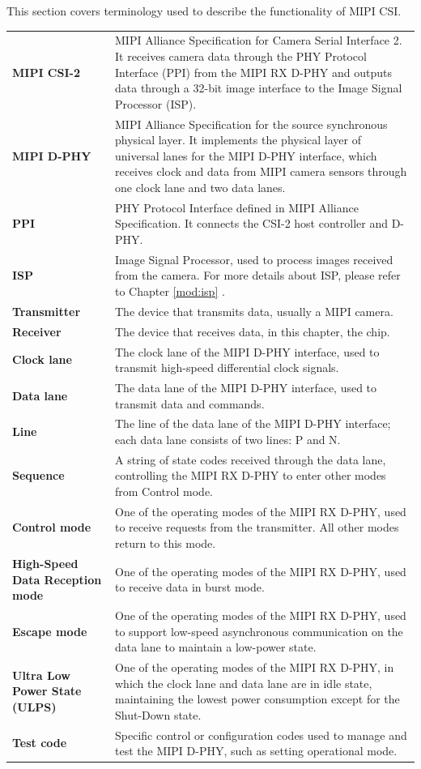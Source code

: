 \documentclass[main\_\_EN.tex]{subfiles}
\begin{document}
This section covers terminology used to describe the functionality of MIPI CSI.

\begin{longtable}[c]{ R{3cm} p{12cm} }
\textbf{MIPI CSI-2}& MIPI Alliance Specification for Camera Serial Interface 2. It receives camera data through the PHY Protocol Interface (PPI) from the MIPI RX D-PHY and outputs data through a 32-bit image interface to the Image Signal Processor (ISP).\\
\textbf{MIPI D-PHY}& MIPI Alliance Specification for the source synchronous physical layer. It implements the physical layer of universal lanes for the MIPI D-PHY interface, which receives clock and data from MIPI camera sensors through one clock lane and two data lanes.\\ 
\textbf{PPI}& PHY Protocol Interface defined in MIPI Alliance Specification. It connects the CSI-2 host controller and D-PHY. \\
\textbf{ISP}& Image Signal Processor, used to process images received from the camera. For more details about ISP, please refer to Chapter \ref{mod:isp} \textit{}. \\
\textbf{Transmitter}& The device that transmits data, usually a MIPI camera. \\
\textbf{Receiver}& The device that receives data, in this chapter, the \chipname{} chip. \\
\textbf{Clock lane}& The clock lane of the MIPI D-PHY interface, used to transmit high-speed differential clock signals.\\
\textbf{Data lane}& The data lane of the MIPI D-PHY interface, used to transmit data and commands.\\
\textbf{Line}& The line of the data lane of the MIPI D-PHY interface; each data lane consists of two lines: P and N.\\
\textbf{Sequence} & A string of state codes received through the data lane, controlling the MIPI RX D-PHY to enter other modes from Control mode.\\
\textbf{Control mode} & One of the operating modes of the MIPI RX D-PHY, used to receive requests from the transmitter. All other modes return to this mode.\\
\textbf{High-Speed Data Reception mode} & One of the operating modes of the MIPI RX D-PHY, used to receive data in burst mode.\\
\textbf{Escape mode} & One of the operating modes of the MIPI RX D-PHY, used to support low-speed asynchronous communication on the data lane to maintain a low-power state.\\
\textbf{Ultra Low Power State (ULPS)} & One of the operating modes of the MIPI RX D-PHY, in which the clock lane and data lane are in idle state, maintaining the lowest power consumption except for the Shut-Down state.\\
\textbf{Test code} & Specific control or configuration codes used to manage and test the MIPI D-PHY, such as setting operational mode.\\ 
\end{longtable}
\end{document}
